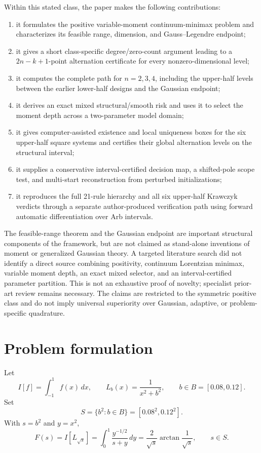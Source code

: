 \documentclass[preprint,12pt]{elsarticle}
\theoremstyle{remark}
\begin{document}
Within this stated class, the paper makes the following contributions:
\begin{enumerate}[label=(\roman*)]
\item it formulates the positive variable-moment continuum-minimax
problem and characterizes its feasible range, dimension, and
Gauss--Legendre endpoint;
\item it gives a short class-specific degree/zero-count argument leading
to a \(2n-k+1\)-point alternation certificate for every
nonzero-dimensional level;
\item it computes the complete path for \(n=2,3,4\), including the
upper-half levels between the earlier lower-half designs and the
Gaussian endpoint;
\item it derives an exact mixed structural/smooth risk and uses it to
select the moment depth across a two-parameter model domain;
\item it gives computer-assisted existence and local uniqueness boxes for
the six upper-half square systems and certifies their global alternation
levels on the structural interval;
\item it supplies a conservative interval-certified decision map, a shifted-pole
scope test, and multi-start reconstruction from perturbed initializations;
\item it reproduces the full 21-rule hierarchy and all six upper-half
Krawczyk verdicts through a separate author-produced verification path
using forward automatic differentiation over Arb intervals.
\end{enumerate}

The feasible-range theorem and the Gaussian endpoint are important
structural components of the framework, but are not claimed as
stand-alone inventions of moment or generalized Gaussian theory. A
targeted literature search did not identify a direct source combining
positivity, continuum Lorentzian minimax, variable moment depth, an exact
mixed selector, and an interval-certified parameter partition. This is not an
exhaustive proof of novelty; specialist prior-art review remains
necessary. The claims are restricted to the symmetric positive class
and do not imply universal superiority over Gaussian, adaptive, or
problem-specific quadrature.

\section{Problem formulation}

Let
\[
I[f]=\int_{-1}^{1} f(x)\,dx,
\qquad
L_b(x)=\frac{1}{x^2+b^2},
\qquad
b\in B=[0.08,0.12].
\]
Set
\[
S=\{b^2:b\in B\}=[0.08^2,0.12^2].
\]
With \(s=b^2\) and \(y=x^2\),
\[
F(s)=I[L_{\sqrt{s}}]
=\int_0^1\frac{y^{-1/2}}{s+y}\,dy
=\frac{2}{\sqrt{s}}\arctan\frac{1}{\sqrt{s}},
\qquad s\in S.
\]
\end{document}
